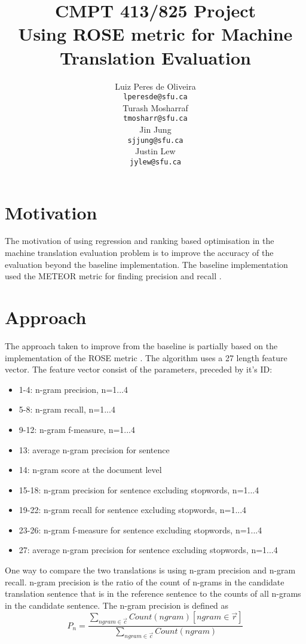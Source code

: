 \documentclass[11pt,letterpaper]{article}
\title{CMPT 413/825 Project\\Using ROSE metric for Machine Translation Evaluation}
\author{Luiz Peres de Oliveira \\
  {\tt lperesde@sfu.ca} \\\And
  Turash Mosharraf \\
  {\tt tmosharr@sfu.ca} \\\And
  Jin Jung \\
  {\tt sjjung@sfu.ca} \\\And
  Justin Lew \\
  {\tt jylew@sfu.ca}
  }
\date{}
\begin{document}
\maketitle

\section{Motivation}

The motivation of using regression and ranking based optimisation in the machine translation evaluation problem is to improve the accuracy of the evaluation beyond the baseline implementation. The baseline implementation used the METEOR metric for finding precision and recall \cite{lavie2007meteor}.

\section{Approach}

The approach taken to improve from the baseline is partially based on the implementation of the ROSE metric \cite{song2011regression}. The algorithm uses a 27 length feature vector. The feature vector consist of the parameters, preceded by it's ID:
	\begin{itemize}
		\item 1-4: n-gram precision, n=1...4
		\item 5-8: n-gram recall, n=1...4
		\item 9-12: n-gram f-measure, n=1...4
		\item 13: average n-gram precision for sentence
		\item 14: n-gram score at the document level
		\item 15-18: n-gram precision for sentence excluding stopwords, n=1...4
		\item19-22: n-gram recall for sentence excluding stopwords, n=1...4
		\item 23-26: n-gram f-measure for sentence excluding stopwords, n=1...4
		\item 27: average n-gram precision for sentence excluding stopwords, n=1...4
	\end{itemize}

One way to compare the two translations is using n-gram precision and n-gram recall. n-gram precision is the ratio of the count of n-grams in the candidate translation sentence that is in the reference sentence to the counts of all n-grams in the candidate sentence. The n-gram precision is defined as 
	\[P_{n} = \frac{\sum_{ngram \in \vec{c} } Count(ngram) [ngram \in \vec{r}] }  {\sum_{ngram\in \vec{c}} Count(ngram)  } \]
\end{document}
